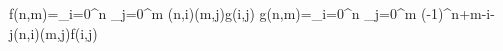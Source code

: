 f(n,m)=\sum_{i=0}^n \sum_{j=0}^m (n,i)(m,j)g(i,j) \iff g(n,m)=\sum_{i=0}^n \sum_{j=0}^m (-1)^{n+m-i-j}(n,i)(m,j)f(i,j)
